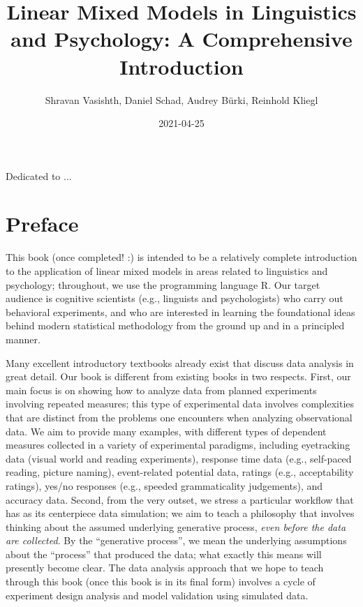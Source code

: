 \documentclass[12pt,]{krantz}
\title{Linear Mixed Models in Linguistics and Psychology: A Comprehensive Introduction}
\author{Shravan Vasishth, Daniel Schad, Audrey Bürki, Reinhold Kliegl}
\date{2021-04-25}
\begin{document}
\maketitle

\thispagestyle{empty}
\begin{center}
Dedicated to ...
\end{center}

\setlength{\abovedisplayskip}{-5pt}
\setlength{\abovedisplayshortskip}{-5pt}

{
\hypersetup{linkcolor=}
\setcounter{tocdepth}{2}
\tableofcontents
}
\hypertarget{preface}{%
\chapter*{Preface}\label{preface}}


This book (once completed! :) is intended to be a relatively complete introduction to the application of linear mixed models in areas related to linguistics and psychology; throughout, we use the programming language R. Our target audience is cognitive scientists (e.g., linguists and psychologists) who carry out behavioral experiments, and who are interested in learning the foundational ideas behind modern statistical methodology from the ground up and in a principled manner.

Many excellent introductory textbooks already exist that discuss data analysis in great detail. Our book is different from existing books in two respects. First, our main focus is on showing how to analyze data from planned experiments involving repeated measures; this type of experimental data involves complexities that are distinct from the problems one encounters when analyzing observational data. We aim to provide many examples, with different types of dependent measures collected in a variety of experimental paradigms, including
eyetracking data (visual world and reading experiments), response time data (e.g., self-paced reading, picture naming), event-related potential data, ratings (e.g., acceptability ratings), yes/no responses (e.g., speeded grammaticality judgements), and accuracy data. Second, from the very outset, we stress a particular workflow that has as its centerpiece data simulation; we aim to teach a philosophy that involves thinking about the assumed underlying generative process, \emph{even before the data are collected}. By the ``generative process'', we mean the underlying assumptions about the ``process'' that produced the data; what exactly this means will presently become clear.
The data analysis approach that we hope to teach through this book (once this book is in its final form) involves a cycle of experiment design analysis and model validation using simulated data.
\end{document}
